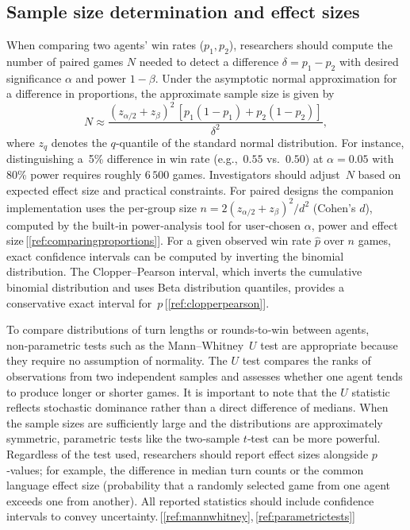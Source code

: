\documentclass[11pt]{article}
\begin{document}
\subsection{Sample size determination and effect sizes}
When comparing two agents’ win rates ($p_1,p_2$), researchers should compute the number of paired games $N$ needed to detect a difference $\delta = p_1 - p_2$ with desired significance $\alpha$ and power $1-\beta$. Under the asymptotic normal approximation for a difference in proportions, the approximate sample size is given by
\begin{equation}
N \approx \frac{(z_{\alpha/2} + z_{\beta})^2\, [p_1(1-p_1) + p_2(1-p_2)]}{\delta^2},
\end{equation}
where $z_q$ denotes the $q$‑quantile of the standard normal distribution. For instance, distinguishing a 5\% difference in win rate (e.g., $0.55$ vs.~$0.50$) at $\alpha=0.05$ with 80\% power requires roughly $6\,500$ games. Investigators should adjust $N$ based on expected effect size and practical constraints. For paired designs the companion implementation uses the per‑group size $n = 2(z_{\alpha/2}+z_{\beta})^2/d^2$ (Cohen's $d$), computed by the built‑in power‑analysis tool for user‑chosen $\alpha$, power and effect size\,[\ref{ref:comparingproportions}]. For a given observed win rate $\hat{p}$ over $n$ games, exact confidence intervals can be computed by inverting the binomial distribution. The Clopper–Pearson interval, which inverts the cumulative binomial distribution and uses Beta distribution quantiles, provides a conservative exact interval for~$p$\,[\ref{ref:clopperpearson}].

To compare distributions of turn lengths or rounds‑to‑win between agents, non‑parametric tests such as the Mann–Whitney $U$ test are appropriate because they require no assumption of normality. The $U$ test compares the ranks of observations from two independent samples and assesses whether one agent tends to produce longer or shorter games. It is important to note that the $U$ statistic reflects stochastic dominance rather than a direct difference of medians. When the sample sizes are sufficiently large and the distributions are approximately symmetric, parametric tests like the two‑sample $t$‑test can be more powerful. Regardless of the test used, researchers should report effect sizes alongside $p$‑values; for example, the difference in median turn counts or the common language effect size (probability that a randomly selected game from one agent exceeds one from another). All reported statistics should include confidence intervals to convey uncertainty.\,[\ref{ref:mannwhitney},\,\ref{ref:parametrictests}]
\end{document}
